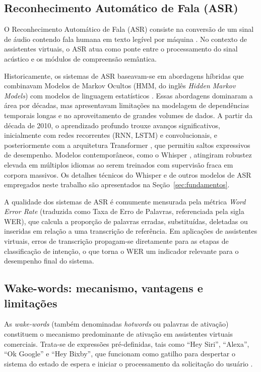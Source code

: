 \documentclass[
    12pt,                %
    openright,           %
    oneside,             %
    a4paper,             %
    english,             %
    brazil               %
]{abntex2}
\begin{document}

\subsection{Reconhecimento Automático de Fala (ASR)}

O Reconhecimento Automático de Fala (ASR) consiste na conversão de um sinal de áudio contendo fala humana em texto legível por máquina \cite{Jurafsky2024}. No contexto de assistentes virtuais, o ASR atua como ponte entre o processamento do sinal acústico e os módulos de compreensão semântica.

Historicamente, os sistemas de ASR baseavam-se em abordagens híbridas que combinavam Modelos de Markov Ocultos (HMM, do inglês \textit{Hidden Markov Models}) com modelos de linguagem estatísticos \cite{Jurafsky2024}. Essas abordagens dominaram a área por décadas, mas apresentavam limitações na modelagem de dependências temporais longas e no aproveitamento de grandes volumes de dados. A partir da década de 2010, o aprendizado profundo trouxe avanços significativos, inicialmente com redes recorrentes (RNN, LSTM) e convolucionais, e posteriormente com a arquitetura Transformer \cite{Vaswani2017}, que permitiu saltos expressivos de desempenho. Modelos contemporâneos, como o Whisper \cite{Radford2023}, atingiram robustez elevada em múltiplos idiomas ao serem treinados com supervisão fraca em corpora massivos. Os detalhes técnicos do Whisper e de outros modelos de ASR empregados neste trabalho são apresentados na Seção~\ref{sec:fundamentos}.

A qualidade dos sistemas de ASR é comumente mensurada pela métrica \textit{Word Error Rate} (traduzida como Taxa de Erro de Palavras, referenciada pela sigla WER), que calcula a proporção de palavras erradas, substituídas, deletadas ou inseridas em relação a uma transcrição de referência. Em aplicações de assistentes virtuais, erros de transcrição propagam-se diretamente para as etapas de classificação de intenção, o que torna o WER um indicador relevante para o desempenho final do sistema.


\subsection{Wake-words: mecanismo, vantagens e limitações}

As \textit{wake-words} (também denominadas \textit{hotwords} ou palavras de ativação) constituem o mecanismo predominante de ativação em assistentes virtuais comerciais. Trata-se de expressões pré-definidas, tais como ``Hey Siri'', ``Alexa'', ``Ok Google'' e ``Hey Bixby'', que funcionam como gatilho para despertar o sistema do estado de espera e iniciar o processamento da solicitação do usuário \cite{Garg2021}.
\end{document}
